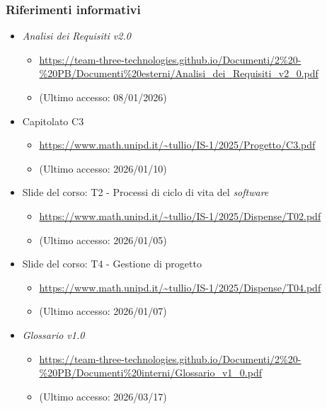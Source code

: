 \documentclass[a4paper,12pt]{article}
\begin{document}
        \subsubsection{Riferimenti informativi}
            \begin{itemize}
                \item \textit{Analisi dei Requisiti v2.0}
                \begin{itemize}
                    \item \url{https://team-three-technologies.github.io/Documenti/2%20-%20PB/Documenti%20esterni/Analisi_dei_Requisiti_v2_0.pdf}
                    \item[] (Ultimo accesso: 08/01/2026)
                \end{itemize}
                \item Capitolato C3
                \begin{itemize}
                    \item \url{https://www.math.unipd.it/~tullio/IS-1/2025/Progetto/C3.pdf}
                    \item[] (Ultimo accesso: 2026/01/10)
                \end{itemize}
                \item Slide del corso: T2 - Processi di ciclo di vita del \textit{software}
                \begin{itemize}
                    \item \url{https://www.math.unipd.it/~tullio/IS-1/2025/Dispense/T02.pdf}
                    \item[] (Ultimo accesso: 2026/01/05)
                \end{itemize}
                \item Slide del corso: T4 - Gestione di progetto
                \begin{itemize}
                    \item \url{https://www.math.unipd.it/~tullio/IS-1/2025/Dispense/T04.pdf}
                    \item[] (Ultimo accesso: 2026/01/07)
                \end{itemize}
                \item \textit{Glossario v1.0}
                \begin{itemize}
                    \item \url{https://team-three-technologies.github.io/Documenti/2%20-%20PB/Documenti%20interni/Glossario_v1_0.pdf}
                    \item[] (Ultimo accesso: 2026/03/17)
                \end{itemize}
            \end{itemize}
\end{document}
